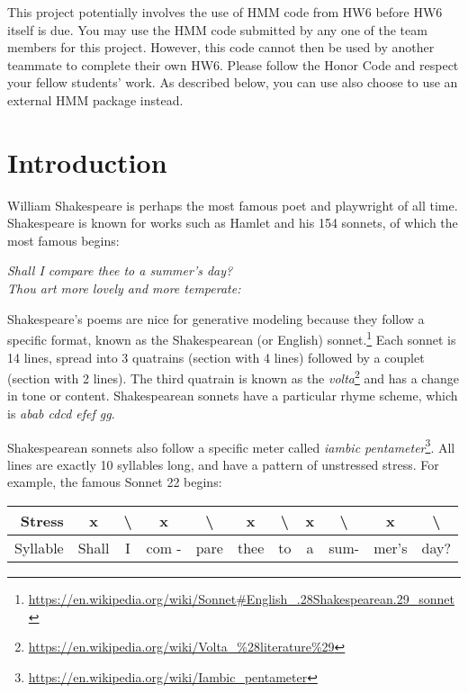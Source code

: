 This project potentially involves the use of HMM code from HW6 before HW6 itself is due. You may use the HMM code submitted by any one of the team members for this project. However, this code cannot then be used by another teammate to complete their own HW6. Please follow the Honor Code and respect your fellow students' work. As described below, you can use also choose to use an external HMM package instead.

\section{Introduction}
William Shakespeare is perhaps the most famous poet and playwright of all time. Shakespeare is known for works such as Hamlet and his 154 sonnets, of which the most famous begins:
\begin{center}\emph{Shall I compare thee to a summer's day?\\
Thou art more lovely and more temperate:}\end{center}

Shakespeare's poems are nice for generative modeling because they follow a specific format, known as the Shakespearean (or English) sonnet.\footnote{\url{https://en.wikipedia.org/wiki/Sonnet\#English\_.28Shakespearean.29\_sonnet}} Each sonnet is 14 lines, spread into 3 quatrains (section with 4 lines) followed by a couplet (section with 2 lines). The third quatrain is known as the \emph{volta}\footnote{\url{https://en.wikipedia.org/wiki/Volta\_\%28literature\%29}} and has a change in tone or content. Shakespearean sonnets have a particular rhyme scheme, which is \emph{abab cdcd efef gg}.

Shakespearean sonnets also follow a specific meter called \emph{iambic pentameter}\footnote{\url{https://en.wikipedia.org/wiki/Iambic_pentameter}}. All lines are exactly 10 syllables long, and have a pattern of unstressed stress. For example, the famous Sonnet 22 begins:

\begin{table}[H]
    \label{tab:meter}
    \centering

    \begin{tabular}{|r|c|c|c|c|c|c|c|c|c|c|}

    \hline
    Stress & x & \textbackslash & x & \textbackslash & x & \textbackslash & x & \textbackslash & x & \textbackslash \\
    \hline
    Syllable & Shall & I & com - &pare & thee & to & a & sum-&mer's & day?\\
    \hline

    \end{tabular}
\end{table}

